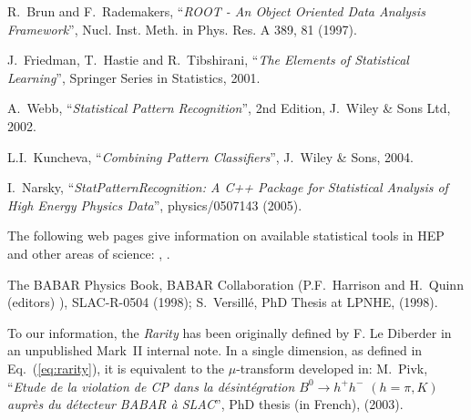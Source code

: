 \begin{thebibliography}{99}


 	      R.~Brun and F.~Rademakers,
                        ``{\em ROOT - An Object Oriented Data Analysis Framework}'',
                         Nucl. Inst. Meth. in Phys. Res. A 389, 81 (1997).

 	J.~Friedman, T.~Hastie and R.~Tibshirani, 
								``{\em The  Elements of Statistical Learning}'', 
                        Springer Series in Statistics, 2001.

      A.~Webb, ``{\em Statistical Pattern Recognition}'',
                        2nd Edition, J.~Wiley \& Sons Ltd, 2002.

  L.I.~Kuncheva, ``{\em Combining Pattern Classifiers}'',
                        J.~Wiley \& Sons, 2004.

        I.~Narsky, 
                        ``{\em StatPatternRecognition: A C++ Package for 
                           Statistical Analysis of High Energy Physics Data}'',
                        physics/0507143 (2005).

 The following web pages give information on available statistical
                        tools in HEP and other areas of science:
                        ,
                        .

     The B{\small A}B{\small AR} Physics Book, 
                        B{\small A}B{\small AR} Collaboration 
                        (P.F.~Harrison and H.~Quinn (editors) \ea),
                        SLAC-R-0504 (1998); 
                        S.~Versill\'e, PhD Thesis at LPNHE, 
                        (1998).

        To our information, the {\em Rarity} has been originally defined by 
                        F. Le Diberder in an unpublished Mark~II internal note. In a single 
                        dimension, as defined in Eq.~(\ref{eq:rarity}), it is equivalent to 
                        the $\mu$-transform developed in: 
                        M.~Pivk, ``{\em Etude de la violation de CP dans la 
                        d\'esint\'egration $B^0\to h^+ h^-$ $(h = \pi, K)$ aupr\`es du 
                        d\'etecteur BABAR \`a SLAC}'', PhD thesis (in French),
                         (2003).


\end{thebibliography}
